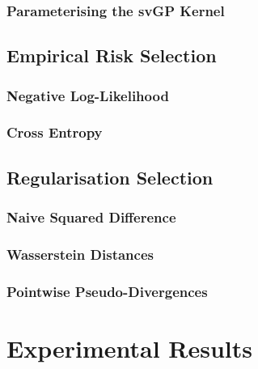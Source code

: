 \documentclass{article}
\numberwithin{equation}{section}
\begin{document}
\subsubsection{Parameterising the svGP Kernel}
\subsection{Empirical Risk Selection}
\subsubsection{Negative Log-Likelihood}
\subsubsection{Cross Entropy}
\subsection{Regularisation Selection}
\subsubsection{Naive Squared Difference}
\subsubsection{Wasserstein Distances}
\subsubsection{Pointwise Pseudo-Divergences}

\newpage
\section{Experimental Results}
\end{document}
